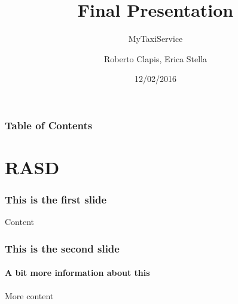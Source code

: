 \documentclass[10pt,xcolor={usenames,dvipsnames}]{beamer}
\title{Final Presentation}
\subtitle{MyTaxiService}
\author{Roberto Clapis, Erica Stella}
\institute{Politecnico di Milano}
\date{12/02/2016}
\begin{document}
\frame{\titlepage}
\begin{frame}
	\frametitle{Table of Contents}
	\tableofcontents[currentsection]
\end{frame}


\section[Section]{RASD}
\begin{frame}
	\frametitle{This is the first slide}
	Content
\end{frame}

\begin{frame}
	\frametitle{This is the second slide}
	\framesubtitle{A bit more information about this}
	More content
\end{frame}
\end{document}
